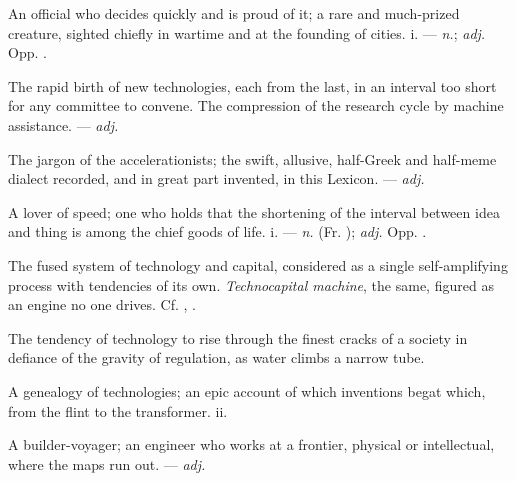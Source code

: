 An official who decides quickly and is proud of it; a rare and much-prized creature, sighted chiefly in wartime and at the founding of cities.   i. ---  \textit{n.};  \textit{adj.} Opp. .

  The rapid birth of new technologies, each from the last, in an interval too short for any committee to convene.   The compression of the research cycle by machine assistance. ---  \textit{adj.}

 The jargon of the accelerationists; the swift, allusive, half-Greek and half-meme dialect recorded, and in great part invented, in this Lexicon. ---  \textit{adj.}

 A lover of speed; one who holds that the shortening of the interval between idea and thing is among the chief goods of life.   i. ---  \textit{n.} (Fr. );  \textit{adj.} Opp. .

 The fused system of technology and capital, considered as a single self-amplifying process with tendencies of its own. \textit{Technocapital machine}, the same, figured as an engine no one drives. Cf. , .

 The tendency of technology to rise through the finest cracks of a society in defiance of the gravity of regulation, as water climbs a narrow tube.

 A genealogy of technologies; an epic account of which inventions begat which, from the flint to the transformer.   ii.

 A builder-voyager; an engineer who works at a frontier, physical or intellectual, where the maps run out. ---  \textit{adj.}

